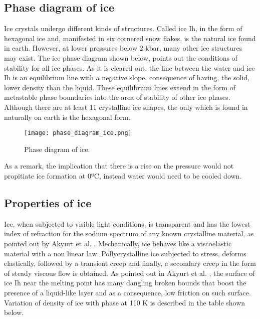 \subsection{Phase diagram of ice}
Ice crystals undergo different kinds of structures. Called ice Ih, in the form of hexagonal ice and, manifested in six cornered snow flakes, is the natural ice found in earth. However, at lower pressures below 2 kbar, many other ice structures may exist.
\newline
The ice phase diagram shown below, points out the conditions of stability for all ice phases. As it is cleared out, the line between the water and ice Ih is an equilibrium line with a negative slope, consequence of having, the solid, lower density than the liquid. These equilibrium lines extend in the form of metastable phase boundaries into the area of stability of other ice phases.
Although there are at least 11 crystalline ice shapes, the only which is found in naturally on earth is the hexagonal form. 
\begin{figure}[h!]
	\centering
	\texttt{[image: phase\_diagram\_ice.png]}
	\caption{Phase diagram of ice.} 
	\label{1.6fig}
\end{figure}
\newline
As a remark, the implication that there is a rise on the pressure would not propitiate ice formation at 0ºC, instead water would need to be cooled down.
\subsection{Properties of ice}
Ice, when subjected to visible light conditions, is transparent and has the lowest index of refraction for the sodium spectrum of any known crystalline material, as pointed out by Akyurt et al. \cite{akyurt_zaki_habeebullah_2002}.
\newline
Mechanically, ice behaves like a viscoelastic material with a non linear law. Pollycrystalline ice subjected to stress, deforms elastically, followed by a transient creep and finally, a secondary creep in the form of steady viscous flow is obtained.
\newline
As pointed out in Akyurt et al. \cite{akyurt_zaki_habeebullah_2002}, the surface of ice Ih near the melting point has many dangling broken bounds that boost the presence of a liquid-like layer and as a consequence, low friction on such surface. Variation of density of ice with phase at 110 K is described in the table shown below.

